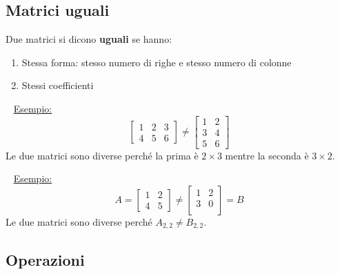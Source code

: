 \documentclass[12pt,oneside]{book}
\begin{document}
\subsection{Matrici uguali}
Due matrici si dicono \textbf{uguali} se hanno:
\begin{enumerate}
    \item Stessa forma: stesso numero di righe e stesso numero di colonne
    \item Stessi coefficienti
\end{enumerate}
~\newline
\underline{Esempio:}
\begin{equation*}
    \begin{bmatrix}
        1 & 2 & 3 \\
        4 & 5 & 6
    \end{bmatrix}
    \neq
    \begin{bmatrix}
        1 & 2 \\
        3 & 4 \\
        5 & 6
    \end{bmatrix}
\end{equation*}
Le due matrici sono diverse perché la prima è $2\times 3$ mentre la seconda è $3\times 2$.

~\newline
\underline{Esempio:}
\begin{equation*}
    A=
    \begin{bmatrix}
        1 & 2 \\
        4 & 5
    \end{bmatrix}
    \neq
    \begin{bmatrix}
        1 & 2 \\
        3 & 0 \\
    \end{bmatrix}
    =B
\end{equation*}
Le due matrici sono diverse perché $A_{2,2} \neq B_{2,2}$.


\subsection{Operazioni}
\end{document}
